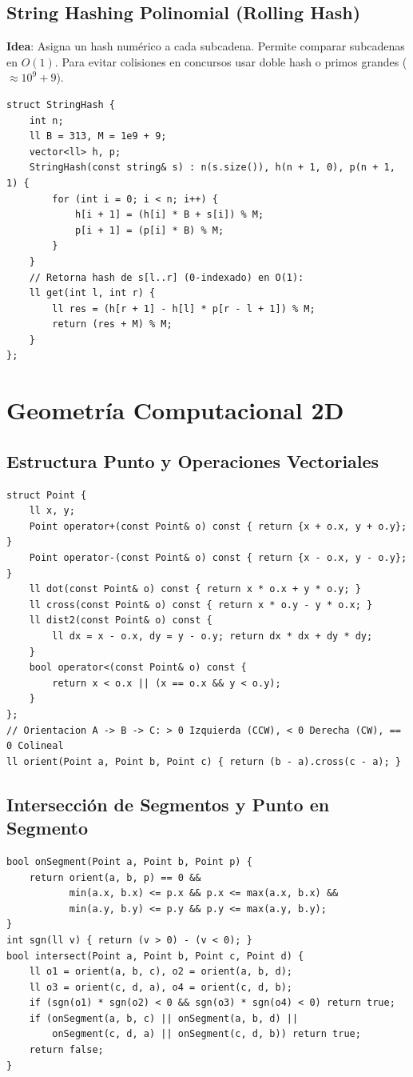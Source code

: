 \documentclass[9pt,twocolumn,a4paper]{extarticle}
\begin{document}
\subsection{String Hashing Polinomial (Rolling Hash)}
\textbf{Idea}: Asigna un hash numérico a cada subcadena. Permite comparar subcadenas en $O(1)$. Para evitar colisiones en concursos usar doble hash o primos grandes ($\approx 10^9 + 9$).
\begin{lstlisting}
struct StringHash {
    int n;
    ll B = 313, M = 1e9 + 9;
    vector<ll> h, p;
    StringHash(const string& s) : n(s.size()), h(n + 1, 0), p(n + 1, 1) {
        for (int i = 0; i < n; i++) {
            h[i + 1] = (h[i] * B + s[i]) % M;
            p[i + 1] = (p[i] * B) % M;
        }
    }
    // Retorna hash de s[l..r] (0-indexado) en O(1):
    ll get(int l, int r) {
        ll res = (h[r + 1] - h[l] * p[r - l + 1]) % M;
        return (res + M) % M;
    }
};
\end{lstlisting}

\section{Geometría Computacional 2D}
\subsection{Estructura Punto y Operaciones Vectoriales}
\begin{lstlisting}
struct Point {
    ll x, y;
    Point operator+(const Point& o) const { return {x + o.x, y + o.y}; }
    Point operator-(const Point& o) const { return {x - o.x, y - o.y}; }
    ll dot(const Point& o) const { return x * o.x + y * o.y; }
    ll cross(const Point& o) const { return x * o.y - y * o.x; }
    ll dist2(const Point& o) const {
        ll dx = x - o.x, dy = y - o.y; return dx * dx + dy * dy;
    }
    bool operator<(const Point& o) const {
        return x < o.x || (x == o.x && y < o.y);
    }
};
// Orientacion A -> B -> C: > 0 Izquierda (CCW), < 0 Derecha (CW), == 0 Colineal
ll orient(Point a, Point b, Point c) { return (b - a).cross(c - a); }
\end{lstlisting}

\subsection{Intersección de Segmentos y Punto en Segmento}
\begin{lstlisting}
bool onSegment(Point a, Point b, Point p) {
    return orient(a, b, p) == 0 &&
           min(a.x, b.x) <= p.x && p.x <= max(a.x, b.x) &&
           min(a.y, b.y) <= p.y && p.y <= max(a.y, b.y);
}
int sgn(ll v) { return (v > 0) - (v < 0); }
bool intersect(Point a, Point b, Point c, Point d) {
    ll o1 = orient(a, b, c), o2 = orient(a, b, d);
    ll o3 = orient(c, d, a), o4 = orient(c, d, b);
    if (sgn(o1) * sgn(o2) < 0 && sgn(o3) * sgn(o4) < 0) return true;
    if (onSegment(a, b, c) || onSegment(a, b, d) ||
        onSegment(c, d, a) || onSegment(c, d, b)) return true;
    return false;
}
\end{lstlisting}
\end{document}
